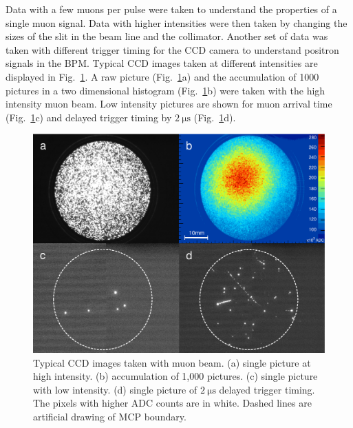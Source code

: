 \documentclass[preprint,3p,twocolumn]{elsarticle}
\begin{document}
Data with a few muons per pulse were taken to understand the
properties of a single muon signal.  Data with higher
intensities were then taken by changing the sizes of the slit in
the beam line and the collimator.  Another set of data was
taken with different trigger timing for the CCD camera to understand
positron signals in the BPM.  Typical CCD images taken at
different intensities are displayed in
Fig.~\ref{fig:single_cluster}.  A raw picture (Fig.~\ref{fig:single_cluster}a) and
the accumulation of 1000 pictures in a two dimensional histogram (Fig.~\ref{fig:single_cluster}b) were taken
with the high intensity muon beam. Low intensity pictures are
shown for muon arrival time (Fig.~\ref{fig:single_cluster}c) and delayed trigger
timing by $\SI{2}{\micro\s}$ (Fig.~\ref{fig:single_cluster}d).

\begin{figure}[tbp]
	\centering
	\includegraphics[width=\columnwidth]{figure/fig3_v3_number.pdf}
	\caption{Typical CCD images taken with muon beam. (a) 
          single picture at high intensity. (b)
          accumulation of 1,000 pictures. (c) single picture
          with low intensity. (d)
          single picture of $\SI{2}{\micro\s}$ delayed trigger timing.
          The pixels with higher ADC counts are in white. Dashed lines are artificial drawing of MCP boundary.           }
	\vspace{-0.4cm}
	\label{fig:single_cluster}
\end{figure}
\end{document}
